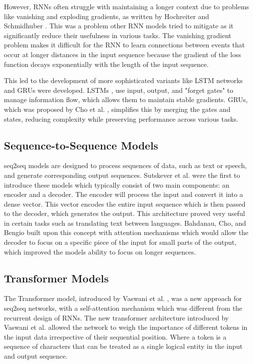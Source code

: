 However, \gls{RNN}s often struggle with maintaining a longer context due to problems like vanishing and exploding gradients, as written by Hochreiter and Schmidhuber \cite{hochreiter_long_1997}. This was a problem other \gls{RNN} models tried to mitigate as it significantly reduce their usefulness in various tasks. The vanishing gradient problem makes it difficult for the \gls{RNN} to learn connections between events that occur at longer distances in the input sequence because the gradient of the loss function decays exponentially with the length of the input sequence.


This led to the development of more sophisticated variants like \gls{LSTM} networks and \gls{GRU}s were developed. \gls{LSTM}s \cite{hochreiter_long_1997}, use input, output, and "forget gates" to manage information flow, which allows them to maintain stable gradients. \gls{GRU}s, which was proposed by Cho et al. \cite{cho_learning_2014}, simplifies this by merging the gates and states, reducing complexity while preserving performance across various tasks.


\subsection{Sequence-to-Sequence Models}


\gls{seq2seq} models are designed to process sequences of data, such as text or speech, and generate corresponding output sequences. Sutskever et al. \cite{sutskever_sequence_2014} were the first to introduce these models which typically consist of two main components: an encoder and a decoder. The encoder will process the input and convert it into a dense vector. This vector encodes the entire input sequence which is then passed to the decoder, which generates the output. This architecture proved very useful in certain tasks such as translating text between languages. Bahdanau, Cho, and Bengio built upon this concept with attention mechanisms \cite{bahdanau_neural_2016} which would allow the decoder to focus on a specific piece of the input for small parts of the output, which improved the models ability to focus on longer sequences.


\subsection{Transformer Models}


The Transformer model, introduced by Vaswani et al. \cite{vaswani_attention_2023}, was a new approach for \gls{seq2seq} networks, with a self-attention mechanism which was different from the recurrent design of \gls{RNN}s. The new transformer architecture introduced by Vaswani et al. allowed the network to weigh the importance of different tokens in the input data irrespective of their sequential position. Where a token is a sequence of characters that can be treated as a single logical entity in the input and output sequence.



